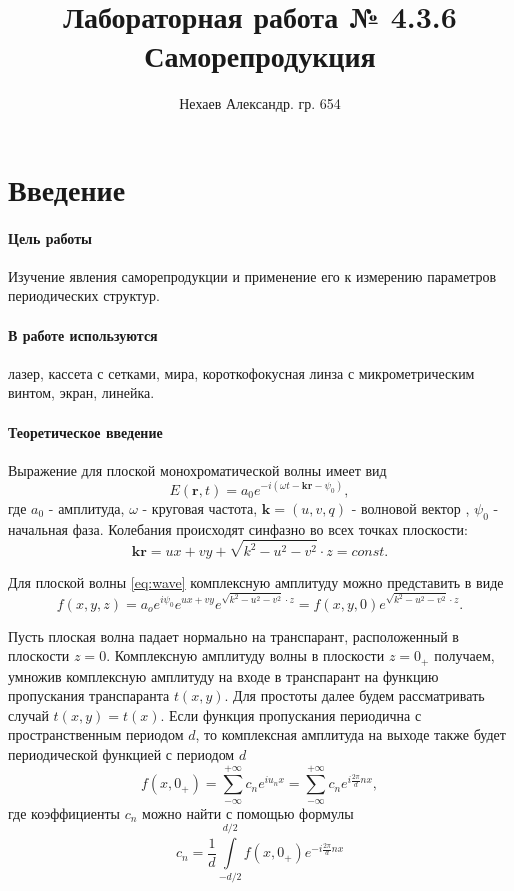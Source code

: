 \documentclass[a4paper, 12pt]{article}
\title{Лабораторная работа № 4.3.6\\Саморепродукция}
\author{Нехаев Александр. гр. 654}
\begin{document}
\maketitle
\newpage
\tableofcontents
\newpage
\section{Введение}
\paragraph{Цель работы} Изучение явления саморепродукции и применение его к измерению параметров периодических структур.
\paragraph{В работе используются} лазер, кассета с сетками, мира, короткофокусная линза с микрометрическим винтом, экран, линейка.
\paragraph{Теоретическое введение}
Выражение для плоской монохроматической волны имеет вид 
	\begin{equation}\label{eq:wave}
		E(\mathbf{r}, t) = a_0e^{-i(\omega t - \mathbf{kr} - \psi_0)}, 
	\end{equation}
	где $a_0$ - амплитуда, $\omega$ - круговая частота, $\mathbf{k} = (u, v, q)$ - волновой вектор , $\psi_0$ - начальная фаза. Колебания происходят синфазно во всех точках плоскости:
	\begin{equation}\label{eq:kr}
		\mathbf{kr} = ux + vy + \sqrt{k^2 - u^2 - v^2}\cdot z = const.
	\end{equation}
	
	Для плоской волны \eqref{eq:wave} комплексную амплитуду можно представить в виде
	\begin{equation}\label{eq:to_z}
		f(x, y, z) = a_oe^{i\psi_0}e^{ux+vy}e^{\sqrt{k^2 - u^2 - v^2}\cdot z} = f(x, y, 0)e^{\sqrt{k^2 - u^2 - v^2}\cdot z}.
	\end{equation}
	
	Пусть плоская волна падает нормально на транспарант, расположенный в плоскости $z = 0$. Комплексную амплитуду волны в плоскости $z = 0_+$ получаем, умножив комплексную амплитуду на входе в транспарант на функцию пропускания транспаранта $t(x, y)$. Для простоты далее будем рассматривать случай $t(x, y) = t(x)$. Если функция пропускания периодична с пространственным периодом $d$, то комплексная амплитуда на выходе также будет периодической функцией с периодом $d$
	\begin{equation}\label{eq:decomp}
		f(x, 0_+) = \sum\limits_{-\infty}^{+\infty} c_ne^{iu_nx} = \sum\limits_{-\infty}^{+\infty} c_ne^{i\frac{2\pi}{d}nx},
	\end{equation}
	где коэффициенты $c_n$ можно найти с помощью формулы
	\begin{equation}\label{eq:coeff}
		c_n = \frac{1}{d} \int\limits_{-d/2}^{d/2} f(x, 0_+)e^{-i\frac{2\pi}{d}nx}
	\end{equation}
	
\end{document}
